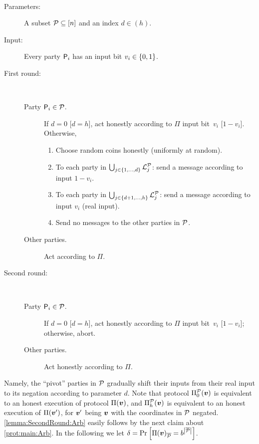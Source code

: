 \newcommand{\PP}{\Pi^\cP}

{ \samepage
\begin{protocol}[$\PP_{d}$]\label{prot:main:Arb} ~
\begin{description}
	\item [Parameters:] A subset $\mathcal{P}\subseteq [n]$ and an index $d\in (h)$.
	\item [Input:] Every party $\mathsf{P}_i$ has an input bit $v_i\in\{0,1\}$.
	
	\item [First round:] ~
	\begin{description}
		\item[Party $\mathsf{P}_i \in \mathcal{P}$.]
		If $d=0$ [\resp $d=h$], act honestly according to $\Pi$ \wrt input bit~$v_i$ [\resp $1-v_i$].
		Otherwise,		
		\begin{enumerate}
			\item Choose random coins honestly (\ie uniformly at random).
			
			\item To each party in $\bigcup_{j \in \left\{1,\ldots,d\right\}} {\cal{L}}_j^{\mathcal{P}}$: send a message according to input $1-v_i$.
			
			\item To each party in $\bigcup_{j \in \left\{d+1 ,\ldots, h\right\}} {\cal{L}}_j^{\mathcal{P}}$: send a message according to input $v_i$ (real input).
			
			\item Send no messages to the other parties in $\mathcal{P}$.
		\end{enumerate}
		
		\item[Other parties.] Act according to $\Pi$.
	\end{description}
	
	\item [Second round:]~
	
	\begin{description}
		\item[Party $\mathsf{P}_i \in \mathcal{P}$.]
        If $d=0$ [\resp $d=h$], act honestly according to $\Pi$ \wrt input bit~$v_i$ [\resp $1-v_i$]; otherwise, abort.
		
		\item[Other parties.] Act honestly according to $\Pi$.
	\end{description}
\end{description}
\end{protocol}
}

Namely, the ``pivot'' parties in $\mathcal{P}$ gradually shift their inputs from their real input to its negation according to parameter $d$. Note that protocol $\PP_{0}(\vv)$ is equivalent to an honest execution of protocol $\Pi({ \boldsymbol{v}})$, and $\PP_{h}(\vv)$ is equivalent to an honest execution of $\Pi({ \boldsymbol{v}}')$, for ${ \boldsymbol{v}}'$ being ${ \boldsymbol{v}}$ with the coordinates in $\mathcal{P}$ negated. \cref{lemma:SecondRound:Arb} easily follows by the next claim about \cref{prot:main:Arb}. In the following we let $\delta = \Pr_{}\left[\Pi({ \boldsymbol{v}})_{\overline{\mathcal{P}}} = b^{\left|{\overline{\mathcal{P}}}\right|}\right]$.

